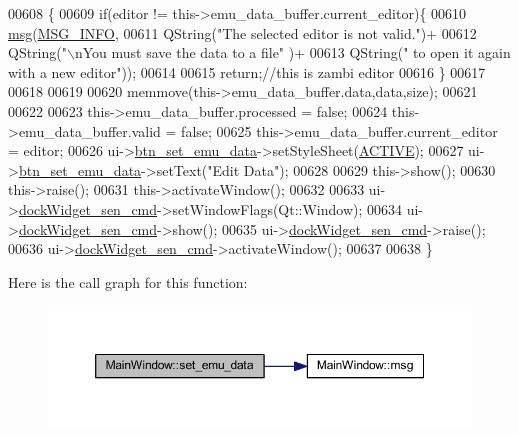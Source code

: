 \begin{DoxyCode}
00608 \{
00609     \textcolor{keywordflow}{if}(editor != this->emu\_data\_buffer.current\_editor)\{
00610       \hyperlink{a00006_a6134b74dbfffbaf333e169bd09597b53}{msg}(\hyperlink{a00034_a1ddcc97224a95cec04b38b0ac866fa19}{MSG\_INFO},
00611           QString(\textcolor{stringliteral}{"The selected editor is not valid."})+
00612           QString(\textcolor{stringliteral}{"\(\backslash\)nYou must save the data to a file"} )+
00613           QString(\textcolor{stringliteral}{" to open it again with a new editor"}));
00614 
00615         \textcolor{keywordflow}{return};\textcolor{comment}{//this is zambi editor}
00616     \}
00617 
00618 
00619 
00620     memmove(this->emu\_data\_buffer.data,data,size);
00621 
00622 
00623     this->emu\_data\_buffer.processed = \textcolor{keyword}{false};
00624     this->emu\_data\_buffer.valid = \textcolor{keyword}{false};
00625     this->emu\_data\_buffer.current\_editor = editor;
00626     ui->\hyperlink{a00027_ad05944ce9c8afb0ab60549a326b8e0af}{btn\_set\_emu\_data}->setStyleSheet(\hyperlink{a00034_a3a6d3cd70078e6046471ec528a09cd19}{ACTIVE});
00627     ui->\hyperlink{a00027_ad05944ce9c8afb0ab60549a326b8e0af}{btn\_set\_emu\_data}->setText(\textcolor{stringliteral}{"Edit Data"});
00628 
00629     this->show();
00630     this->\textcolor{keyword}{raise}();
00631     this->activateWindow();
00632 
00633     ui->\hyperlink{a00027_a9eb86a5ee396766f0f4a65f2d2bd7688}{dockWidget\_sen\_cmd}->setWindowFlags(Qt::Window);
00634     ui->\hyperlink{a00027_a9eb86a5ee396766f0f4a65f2d2bd7688}{dockWidget\_sen\_cmd}->show();
00635     ui->\hyperlink{a00027_a9eb86a5ee396766f0f4a65f2d2bd7688}{dockWidget\_sen\_cmd}->raise();
00636     ui->\hyperlink{a00027_a9eb86a5ee396766f0f4a65f2d2bd7688}{dockWidget\_sen\_cmd}->activateWindow();
00637 
00638 \}
\end{DoxyCode}


Here is the call graph for this function\+:
\nopagebreak
\begin{figure}[H]
\begin{center}
\leavevmode
\includegraphics[width=350pt]{de/d21/a00006_ae9bed0c4d2f2c63c95a68f53f65f4359_cgraph}
\end{center}
\end{figure}


